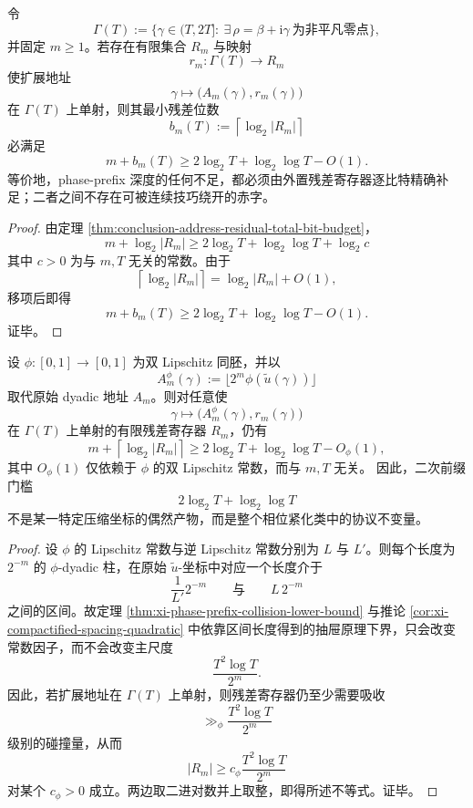 \begin{theorem}[前缀地址与外置残差之间的精确守恒律]\label{thm:conclusion-prefix-address-external-residual-exact-conservation}
令
\[
\Gamma(T):=\{\gamma\in(T,2T]:\ \exists\,\rho=\beta+\mathrm{i}\gamma\ \text{为非平凡零点}\},
\]
并固定 \(m\ge 1\)。若存在有限集合 \(R_m\) 与映射
\[
r_m:\Gamma(T)\to R_m
\]
使扩展地址
\[
\gamma\longmapsto \bigl(A_m(\gamma),r_m(\gamma)\bigr)
\]
在 \(\Gamma(T)\) 上单射，则其最小残差位数
\[
b_m(T):=\left\lceil \log_2 |R_m|\right\rceil
\]
必满足
\[
m+b_m(T)\ge 2\log_2 T+\log_2\log T-O(1).
\]
等价地，phase-prefix 深度的任何不足，都必须由外置残差寄存器逐比特精确补足；二者之间不存在可被连续技巧绕开的赤字。
\end{theorem}
\begin{proof}
由定理 \ref{thm:conclusion-address-residual-total-bit-budget}，
\[
m+\log_2|R_m|
\ge
2\log_2 T+\log_2\log T+\log_2 c
\]
其中 \(c>0\) 为与 \(m,T\) 无关的常数。由于
\[
\left\lceil \log_2|R_m|\right\rceil=\log_2|R_m|+O(1),
\]
移项后即得
\[
m+b_m(T)\ge 2\log_2 T+\log_2\log T-O(1).
\]
证毕。
\end{proof}

\begin{proposition}\label{prop:conclusion-quadratic-prefix-threshold-bilipschitz-invariance}
设 \(\phi:[0,1]\to[0,1]\) 为双 Lipschitz 同胚，并以
\[
A_m^\phi(\gamma):=\bigl\lfloor 2^m\phi(\widetilde u(\gamma))\bigr\rfloor
\]
取代原始 dyadic 地址 \(A_m\)。则对任意使
\[
\gamma\longmapsto \bigl(A_m^\phi(\gamma),r_m(\gamma)\bigr)
\]
在 \(\Gamma(T)\) 上单射的有限残差寄存器 \(R_m\)，仍有
\[
m+\left\lceil \log_2|R_m|\right\rceil
\ge
2\log_2 T+\log_2\log T-O_\phi(1),
\]
其中 \(O_\phi(1)\) 仅依赖于 \(\phi\) 的双 Lipschitz 常数，而与 \(m,T\) 无关。
因此，二次前缀门槛
\[
2\log_2 T+\log_2\log T
\]
不是某一特定压缩坐标的偶然产物，而是整个相位紧化类中的协议不变量。
\end{proposition}
\begin{proof}
设 \(\phi\) 的 Lipschitz 常数与逆 Lipschitz 常数分别为 \(L\) 与 \(L'\)。则每个长度为 \(2^{-m}\) 的 \(\phi\)-dyadic 柱，在原始 \(\widetilde u\)-坐标中对应一个长度介于
\[
\frac{1}{L'}2^{-m}
\qquad\text{与}\qquad
L\,2^{-m}
\]
之间的区间。故定理 \ref{thm:xi-phase-prefix-collision-lower-bound} 与推论 \ref{cor:xi-compactified-spacing-quadratic} 中依靠区间长度得到的抽屉原理下界，只会改变常数因子，而不会改变主尺度
\[
\frac{T^2\log T}{2^m}.
\]
因此，若扩展地址在 \(\Gamma(T)\) 上单射，则残差寄存器仍至少需要吸收
\[
\gg_\phi \frac{T^2\log T}{2^m}
\]
级别的碰撞量，从而
\[
|R_m|\ge c_\phi\frac{T^2\log T}{2^m}
\]
对某个 \(c_\phi>0\) 成立。两边取二进对数并上取整，即得所述不等式。证毕。
\end{proof}

